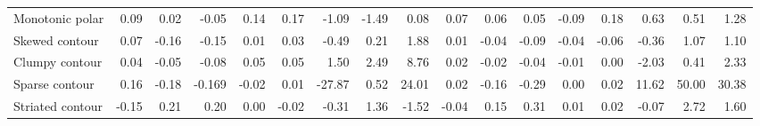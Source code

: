 \documentclass{article}
\begin{document}
\begin{table}[!ht]
{\begin{tabular}{lrrrrrrrrrrrrrrrr}
Monotonic polar                                                         & 0.09                     & 0.02                     & -0.05                    & 0.14                     & 0.17                     & -1.09                    & -1.49                    & 0.08                     & 0.07                     & 0.06                     & 0.05                     & -0.09                    & 0.18                     & 0.63                     & 0.51                     & 1.28                     \\
Skewed contour                                                          & 0.07                     & -0.16                    & -0.15                    & 0.01                     & 0.03                     & -0.49                    & 0.21                     & 1.88                     & 0.01                     & -0.04                    & -0.09                    & -0.04                    & -0.06                    & -0.36                    & 1.07                     & 1.10                     \\
Clumpy contour                                                          & 0.04                     & -0.05                    & -0.08                    & 0.05                     & 0.05                     & 1.50                     & 2.49                     & 8.76                     & 0.02                     & -0.02                    & -0.04                    & -0.01                    & 0.00                     & -2.03                    & 0.41                     & 2.33                     \\
Sparse contour                                                          & 0.16                     & -0.18                    & -0.169                   & -0.02                    & 0.01                     & -27.87                   & 0.52                     & 24.01                    & 0.02                     & -0.16                    & -0.29                    & 0.00                     & 0.02                     & 11.62                    & 50.00                    & 30.38                    \\
Striated contour                                                        & -0.15                    & 0.21                     & 0.20                     & 0.00                     & -0.02                    & -0.31                    & 1.36                     & -1.52                    & -0.04                    & 0.15                     & 0.31                     & 0.01                     & 0.02                     & -0.07                    & 2.72                     & 1.60                     \\

\end{tabular}}
\end{table}
\end{document}
